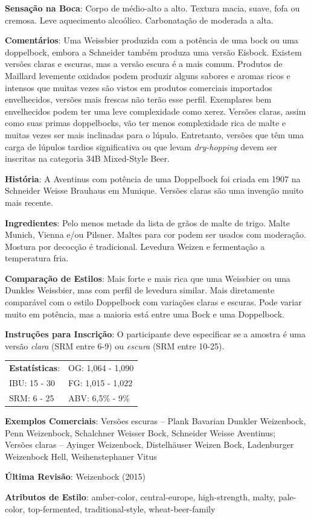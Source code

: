 \textbf{Sensação na Boca}: Corpo de médio-alto a alto. Textura macia, suave, fofa ou cremosa. Leve aquecimento alcoólico. Carbonatação de moderada a alta.

\textbf{Comentários}: Uma Weissbier produzida com a potência de uma bock ou uma doppelbock, embora a Schneider também produza uma versão Eisbock. Existem versões claras e escuras, mas a versão escura é a mais comum. Produtos de Maillard levemente oxidados podem produzir alguns sabores e aromas ricos e intensos que muitas vezes são vistos em produtos comerciais importados envelhecidos, versões mais frescas não terão esse perfil. Exemplares bem envelhecidos podem ter uma leve complexidade como xerez. Versões claras, assim como suas primas doppelbocks, vão ter menos complexidade rica de malte e muitas vezes ser mais inclinadas para o lúpulo. Entretanto, versões que têm uma carga de lúpulos tardios significativa ou que levam \textit{dry-hopping} devem ser inscritas na categoria 34B Mixed-Style Beer.

\textbf{História}: A Aventinus com potência de uma Doppelbock foi criada em 1907 na Schneider Weisse Brauhaus em Munique. Versões claras são uma invenção muito mais recente.

\textbf{Ingredientes}: Pelo menos metade da lista de grãos de malte de trigo. Malte Munich, Vienna e/ou Pilsner. Maltes para cor podem ser usados com moderação. Mostura por decocção é tradicional. Levedura Weizen e fermentação a temperatura fria.

\textbf{Comparação de Estilos}: Mais forte e mais rica que uma Weissbier ou uma Dunkles Weissbier, mas com perfil de levedura similar. Mais diretamente comparável com o estilo Doppelbock com variações claras e escuras. Pode variar muito em potência, mas a maioria está entre uma Bock e uma Doppelbock.

\textbf{Instruções para Inscrição}: O participante deve especificar se a amostra é uma versão \textit{clara} (SRM entre 6-9) ou \textit{escura} (SRM entre 10-25).

\begin{tabular}{@{}p{35mm}p{35mm}@{}}
  \textbf{Estatísticas}: & OG: 1,064 - 1,090 \\
  IBU: 15 - 30 & FG: 1,015 - 1,022 \\
  SRM: 6 - 25 & ABV: 6,5\% - 9\%
\end{tabular}

\textbf{Exemplos Comerciais}: Versões escuras – Plank Bavarian Dunkler Weizenbock, Penn Weizenbock, Schalchner Weisser Bock, Schneider Weisse Aventinus; \\
Versões claras – Ayinger Weizenbock, Distelhäuser Weizen Bock, Ladenburger Weizenbock Hell, Weihenstephaner Vitus

\textbf{Última Revisão}: Weizenbock (2015)

\textbf{Atributos de Estilo}: amber-color, central-europe, high-strength, malty, pale-color, top-fermented, traditional-style, wheat-beer-family
